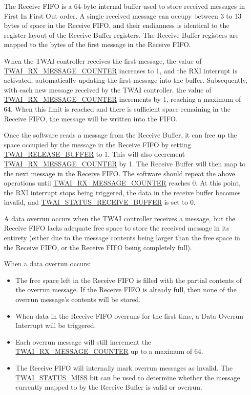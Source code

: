\documentclass[main\_\_EN.tex]{subfiles}
\begin{document}
The Receive FIFO is a 64-byte internal buffer used to store received messages in First In First Out order. A single received message can occupy between 3 to 13 bytes of space in the Receive FIFO, and their endianness is identical to the register layout of the Receive Buffer registers. The Receive Buffer registers are mapped to the bytes of the first message in the Receive FIFO.

When the TWAI controller receives the first message, the value of \hyperref[fielddesc:TWAIRXMESSAGECOUNTER]{TWAI\_RX\_MESSAGE\_COUNTER} increases to 1, and the RXI interrupt is activated, automatically updating the first message into the buffer. Subsequently, with each new message received by the TWAI controller, the value of \hyperref[fielddesc:TWAIRXMESSAGECOUNTER]{TWAI\_RX\_MESSAGE\_COUNTER} increments by 1, reaching a maximum of 64. When this limit is reached and there is sufficient space remaining in the Receive FIFO, the message will be written into the FIFO.

Once the software reads a message from the Receive Buffer, it can free up the space occupied by the message in the Receive FIFO by setting \hyperref[fielddesc:TWAIRELEASEBUFFER]{TWAI\_RELEASE\_BUFFER} to 1. This will also decrement \hyperref[fielddesc:TWAIRXMESSAGECOUNTER]{TWAI\_RX\_MESSAGE\_COUNTER} by 1. The Receive Buffer will then map to the next message in the Receive FIFO. The software should repeat the above operations until \hyperref[fielddesc:TWAIRXMESSAGECOUNTER]{TWAI\_RX\_MESSAGE\_COUNTER} reaches 0. At this point, the RXI interrupt stops being triggered, the data in the receive buffer becomes invalid, and \hyperref[fielddesc:TWAISTATUSRECEIVEBUFFER]{TWAI\_STATUS\_RECEIVE\_BUFFER} is set to 0.

A data overrun occurs when the TWAI controller receives a message, but the Receive FIFO lacks adequate free space to store the received message in its entirety (either due to the message contents being larger than the free space in the Receive FIFO, or the Receive FIFO being completely full).

When a data overrun occurs:
\begin{itemize}
    \item The free space left in the Receive FIFO is filled with the partial contents of the overrun message. If the Receive FIFO is already full, then none of the overrun message's contents will be stored.
    \item When data in the Receive FIFO overruns for the first time, a Data Overrun Interrupt will be triggered.
    \item Each overrun message will still increment the  \hyperref[fielddesc:TWAIRXMESSAGECOUNTER]{TWAI\_RX\_MESSAGE\_COUNTER} up to a maximum of 64.
    \item The Receive FIFO will internally mark overrun messages as invalid. The \hyperref[fielddesc:TWAISTATUSMISS]{TWAI\_STATUS\_MISS} bit can be used to determine whether the message currently mapped to by the Receive Buffer is valid or overrun.
\end{itemize}
\end{document}
